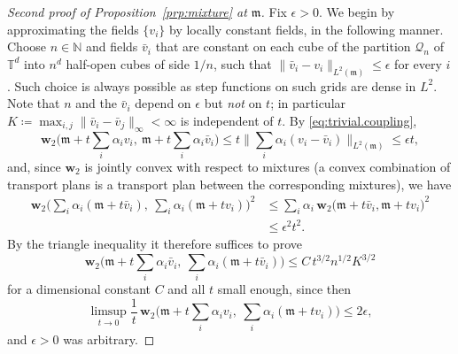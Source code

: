 \documentclass[11pt,reqno]{amsart}
\theoremstyle{plain}
\theoremstyle{definition}
\newcommand{\dw}{\mathbf{w}_2}
\newcommand{\T}{\mathbb{T}}
\newcommand{\N}{\mathbb{N}}
\newcommand{\Leb}{\mathfrak{m}}
\begin{document}
\begin{proof}[Second proof of Proposition~\ref{prp:mixture} at \( \Leb \)]
    Fix \( \epsilon>0 \).
    We begin by approximating the fields \(\{v_i\}\) by locally constant fields, in the following manner.
    Choose \( n\in\N \) and fields \( \bar v_i \) that are constant on each cube of the partition \( \mathcal Q_n \) of \( \T^d \) into \( n^d \) half-open cubes of side \( 1/n \), such that \( \lVert \bar v_i-v_i \rVert_{L^2(\Leb)}\le\epsilon \) for every \( i \).
    Such choice is always possible as step functions on such grids are dense in \( L^2 \).
    Note that \( n \) and the \( \bar v_i \) depend on \( \epsilon \) but \emph{not} on \( t \); in particular \( K\coloneqq \max_{i,j}\lVert \bar v_i-\bar v_j \rVert_\infty<\infty \) is independent of \( t \).
    By \eqref{eq:trivial.coupling},
    \[
        \dw\Big(\Leb+t\sum_i\alpha_iv_i,\ \Leb+t\sum_i\alpha_i\bar v_i\Big)
        \le t\Big\lVert \sum_i\alpha_i(v_i-\bar v_i) \Big\rVert_{L^2(\Leb)}\le\epsilon t,
    \]
    and, since \( \dw \) is jointly convex with respect to mixtures (a convex combination of transport plans is a transport plan between the corresponding mixtures), we have
    \[
    \begin{split}
        \dw\Big(\sum_i\alpha_i(\Leb+t\bar v_i),\ \sum_i\alpha_i(\Leb+tv_i)\Big)^2
        &\le\sum_i\alpha_i\,\dw\big(\Leb+t\bar v_i,\Leb+tv_i\big)^2 \\
        &\le\epsilon^2t^2.
    \end{split}
    \]
    By the triangle inequality it therefore suffices to prove
    \begin{equation}\label{eq:mixture.discrete}
        \dw\Big(\Leb+t\sum_i\alpha_i\bar v_i,\ \sum_i\alpha_i(\Leb+t\bar v_i)\Big)
        \le C\,t^{3/2}n^{1/2}K^{3/2}
    \end{equation}
    for a dimensional constant \( C \) and all \( t \) small enough, since then
    \[
        \limsup_{t\to0}\frac{1}{t}\,
        \dw\Big(\Leb+t\sum_i\alpha_iv_i,\ \sum_i\alpha_i(\Leb+tv_i)\Big)\le2\epsilon,
    \]
    and \( \epsilon>0 \) was arbitrary.


\end{proof}
\end{document}
